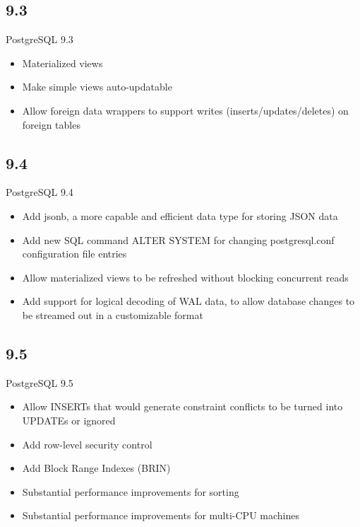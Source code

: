 \documentclass[t,10pt]{beamer}
\begin{document}
\subsection{9.3}
\begin{frame}{PostgreSQL 9.3}
  \begin{itemize}%
  \item Materialized views
  \item Make simple views auto-updatable
  \item Allow foreign data wrappers to support writes (inserts/updates/deletes) on foreign tables
  \end{itemize}
\end{frame}
\subsection{9.4}
\begin{frame}{PostgreSQL 9.4}
  \begin{itemize}%
  \item Add jsonb, a more capable and efficient data type for storing JSON data
  \item Add new SQL command ALTER SYSTEM for changing postgresql.conf configuration file entries
  \item Allow materialized views to be refreshed without blocking concurrent reads
  \item Add support for logical decoding of WAL data, to allow database changes to be streamed out in a customizable format
  \end{itemize}
\end{frame}
\subsection{9.5}
\begin{frame}{PostgreSQL 9.5}
  \begin{itemize}%
  \item Allow INSERTs that would generate constraint conflicts to be turned into UPDATEs or ignored
  \item Add row-level security control
  \item Add Block Range Indexes (BRIN)
  \item Substantial performance improvements for sorting
  \item Substantial performance improvements for multi-CPU machines
  \end{itemize}
\end{frame}
\end{document}
